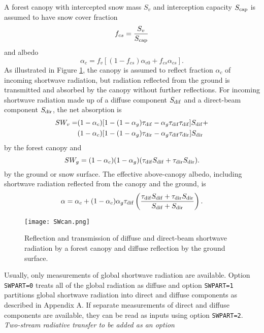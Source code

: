 \documentclass{article}
\begin{document}
A forest canopy with intercepted snow mass $S_v$ and interception capacity $S_{\rm cap}$ is assumed to have snow cover fraction 
\begin{equation}
f_{cs} = \frac{S_v}{S_{\rm cap}}
\end{equation}
and albedo
\begin{equation}
\alpha_c = f_v[(1 - f_{cs})\alpha_{c0} + f_{cs}\alpha_{cs}].
\end{equation}
As illustrated in Figure \ref{fig:SWcan}, the canopy is assumed to reflect fraction $\alpha_c$ of incoming shortwave radiation, but radiation reflected from the ground is transmitted and absorbed by the canopy without further reflections. For incoming shortwave radiation made up of a diffuse component $S_{\rm dif}$ and a direct-beam component $S_{\rm dir}$, the net absorption is
\begin{align}
SW_v = & (1 - \alpha_c)[1 - (1 - \alpha_g)\tau_{\rm dif} 
                          - \alpha_g\tau_{\rm dif}\tau_{\rm dif}]S_{\rm dif} + \\
       & (1 - \alpha_c)[1 - (1 - \alpha_g)\tau_{\rm dir} 
                          -  \alpha_g\tau_{\rm dif}\tau_{\rm dir}]S_{\rm dir}
\label{eq:SWv} 
\end{align}
by the forest canopy and
\begin{equation}
SW_g = (1 - \alpha_c)(1 - \alpha_g)(\tau_{\rm dif}S_{\rm dif} + \tau_{\rm dir}S_{\rm dir}).
\label{eq:SWg} 
\end{equation}
by the ground or snow surface. The effective above-canopy albedo, including shortwave radiation reflected from the canopy and the ground, is
\begin{equation}
\alpha = \alpha_c + (1 - \alpha_c)\alpha_g\tau_{\rm dif}\left(
         \frac{\tau_{\rm dif}S_{\rm dif} + \tau_{\rm dir}S_{\rm dir}}
              {S_{\rm dif} + S_{\rm dir}}\right).
\end{equation} 

\begin{figure}[t]
\texttt{[image: SWcan.png]}
\caption{Reflection and transmission of diffuse and direct-beam shortwave radiation by a forest canopy and diffuse reflection by the ground surface.}
\label{fig:SWcan}
\end{figure}

Usually, only measurements of global shortwave radiation are available. Option {\tt SWPART=0} treats all of the global radiation as diffuse and option {\tt SWPART=1} partitions global shortwave radiation into direct and diffuse components as described in Appendix A. If separate measurements of direct and diffuse components are available, they can be read as inputs using option {\tt SWPART=2}. {\it Two-stream radiative transfer to be added as an option}
\end{document}
